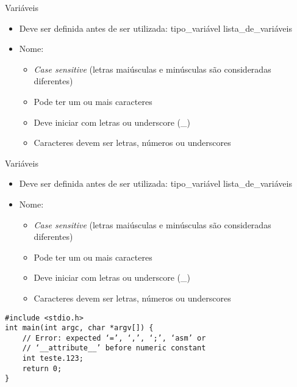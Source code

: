\documentclass[t, aspectratio=169]{beamer}
\begin{document}
\begin{frame}[label={sec:orge559ae9}]{Variáveis}
\begin{itemize}
\item Deve ser definida antes de ser utilizada: \alert{\color{highlight}tipo\_variável \color{blue!80}lista\_de\_variáveis}
\item \color{black}Nome:
\begin{itemize}
\item \emph{Case sensitive} (letras maiúsculas e minúsculas são consideradas diferentes)
\item Pode ter um ou mais caracteres
\item Deve iniciar com letras ou underscore (\_)
\item Caracteres devem ser letras, números ou underscores
\end{itemize}
\end{itemize}
\end{frame}

\begin{frame}[label={sec:org5f7b851},fragile]{Variáveis}
 \begin{itemize}
\item Deve ser definida antes de ser utilizada: \alert{\color{highlight}tipo\_variável \color{blue!80}lista\_de\_variáveis}
\item \color{black}Nome:
\begin{itemize}
\item \emph{Case sensitive} (letras maiúsculas e minúsculas são consideradas diferentes)
\item Pode ter um ou mais caracteres
\item Deve iniciar com letras ou underscore (\_)
\item Caracteres devem ser letras, números ou underscores
\end{itemize}
\end{itemize}

\begin{verbatim}
#include <stdio.h>
int main(int argc, char *argv[]) {
    // Error: expected ‘=’, ‘,’, ‘;’, ‘asm’ or
    // ‘__attribute__’ before numeric constant
    int teste.123;
    return 0;
}
\end{verbatim}
\end{frame}
\end{document}
